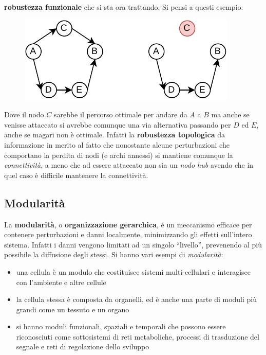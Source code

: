 \documentclass[a4paper,12pt, oneside]{book}
\begin{document}
\textbf{robustezza funzionale} che si sta ora trattando. Si pensi a questi
esempio:
\begin{figure}[H]
  \centering
  \includegraphics[scale = 1]{img/rob4.pdf}
\end{figure}
Dove il nodo $C$ sarebbe il percorso ottimale per andare da $A$ a $B$ ma anche
se venisse attaccato si avrebbe comunque una via alternativa passando per $D$ ed
$E$, anche se magari non è ottimale. Infatti la \textbf{robustezza topologica}
da informazione in merito al 
fatto che nonostante alcune perturbazioni che comportano la perdita di nodi (e
archi annessi) si mantiene comunque la \textit{connettività}, a meno che ad
essere attaccato non sia un \textit{nodo hub} avendo che in quel caso è
difficile mantenere la connettività.
\subsection{Modularità}
La \textbf{modularità}, o \textbf{organizzazione gerarchica}, è un meccanismo
efficace per contenere perturbazioni e danni localmente, minimizzando gli
effetti sull'intero sistema. Infatti i danni vengono limitati ad un singolo
``livello'', prevenendo al più possibile la diffusione degli stessi. Si hanno
vari esempi di \textit{modularità}:
\begin{itemize}
  \item una cellula è un modulo che costituisce sistemi multi-cellulari e
  interagisce con l'ambiente e altre cellule
  \item la cellula stessa è composta da organelli, ed è anche una parte di
  moduli 
  più grandi come un tessuto e un organo 
  \item si hanno moduli funzionali, spaziali e temporali che possono essere
  riconosciuti come sottosistemi di reti metaboliche, processi di trasduzione
  del segnale e reti di regolazione dello sviluppo 
\end{itemize}
\end{document}
